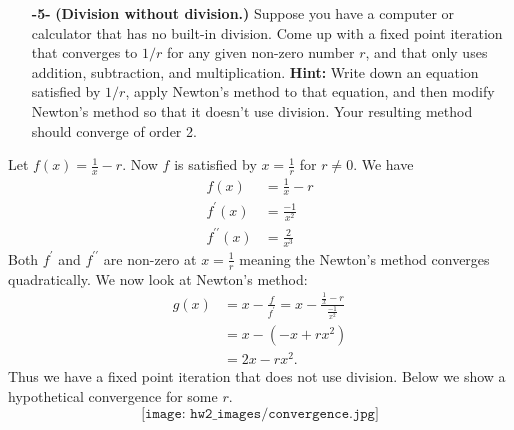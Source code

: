 \documentclass[11pt]{article}
\theoremstyle{definition}
\newcommand{\1}[1]{\mathbf{1} \left \{ #1 \right \}}
\begin{document}
\begin{itemize}
    \item[{\textbf{-5-}}] \textbf{(Division without division.)}  Suppose you have a computer or calculator that has no built-in division.  Come up with a fixed point iteration that converges to $1/r$ for any given non-zero number $r$, and that only uses addition, subtraction, and multiplication.  \textbf{Hint:}  Write down an equation satisfied by $1/r$, apply Newton's method to that equation, and then modify Newton's method so that it doesn't use division.  Your resulting method should converge of order 2.
\end{itemize}
Let \(f(x) = \frac{1}{x} - r\).  Now $f$ is satisfied by $x = \frac{1}{r}$ for $r \neq 0$.  We have
\begin{equation*}
    \begin{split}
        f(x) &= \frac{1}{x} - r \\
        f^{\prime}(x) &= \frac{-1}{x^2} \\
        f^{\prime\prime}(x) &= \frac{2}{x^3}
    \end{split}
\end{equation*}
Both $f^{\prime}$ and $f^{\prime\prime}$ are non-zero at $x = \frac{1}{r}$ meaning the Newton's method converges quadratically.  We now look at Newton's method:
\begin{equation*}
    \begin{split}
        g(x) &= x - \frac{f}{f^{\prime}} = x - \frac{\frac{1}{x} - r}{\frac{-1}{x^2}} \\
        &= x - (-x + rx^2) \\
        &= 2x - rx^2.
    \end{split}
\end{equation*}
Thus we have a fixed point iteration that does not use division.  Below we show a hypothetical convergence for some $r$.
\[\texttt{[image: hw2\_images/convergence.jpg]}\]
\end{document}

